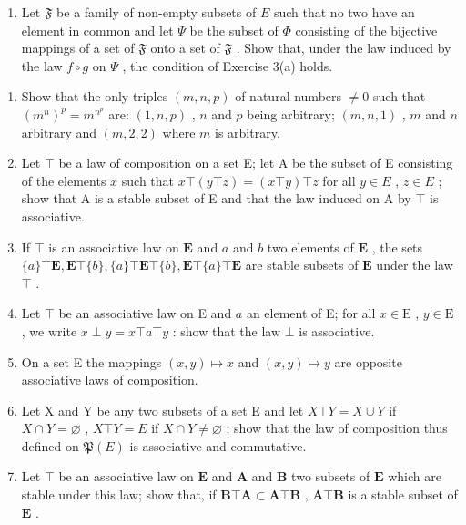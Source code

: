 \begin{enumerate}
\def\labelenumi{(\alph{enumi})}
\setcounter{enumi}{1}
\tightlist
\item
  Let \(\mathfrak{F}\) be a family of non-empty subsets of \(E\) such that no two have an element in common and let \(\Psi\) be the subset of \(\Phi\) consisting of the bijective mappings of a set of \(\mathfrak{F}\) onto a set of \(\mathfrak{F}\) . Show that, under the law induced by the law \(f \circ g\) on \(\Psi\) , the condition of Exercise 3(a) holds.
\end{enumerate}

\begin{enumerate}
\def\labelenumi{\arabic{enumi}.}
\setcounter{enumi}{4}
\item
  Show that the only triples \((m, n, p)\) of natural numbers \(\neq 0\) such that \((m^n)^p = m^{n^p}\) are: \((1, n, p)\) , \(n\) and \(p\) being arbitrary; \((m, n, 1)\) , \(m\) and \(n\) arbitrary and \((m, 2, 2)\) where \(m\) is arbitrary.
\item
  Let \(\top\) be a law of composition on a set E; let A be the subset of E consisting of the elements \(x\) such that \(x \top (y \top z) = (x \top y) \top z\) for all \(y \in E\) , \(z \in E\) ; show that A is a stable subset of E and that the law induced on A by \(\top\) is associative.
\item
  If \(\top\) is an associative law on \(\mathbf{E}\) and \(a\) and \(b\) two elements of \(\mathbf{E}\) , the sets \(\{a\} \top \mathbf{E}, \mathbf{E} \top \{b\}, \{a\} \top \mathbf{E} \top \{b\}, \mathbf{E} \top \{a\} \top \mathbf{E}\) are stable subsets of \(\mathbf{E}\) under the law \(\top\) .
\item
  Let \(\top\) be an associative law on E and \(a\) an element of E; for all \(x \in \mathrm{E}\) , \(y \in \mathrm{E}\) , we write \(x \perp y = x \top a \top y\) : show that the law \(\bot\) is associative.
\item
  On a set E the mappings \((x,y)\mapsto x\) and \((x,y)\mapsto y\) are opposite associative laws of composition.
\item
  Let X and Y be any two subsets of a set E and let \(X \top Y = X \cup Y\) if \(X \cap Y = \varnothing\) , \(X \top Y = E\) if \(X \cap Y \neq \varnothing\) ; show that the law of composition thus defined on \(\mathfrak{P}(E)\) is associative and commutative.
\item
  Let \(\top\) be an associative law on \(\mathbf{E}\) and \(\mathbf{A}\) and \(\mathbf{B}\) two subsets of \(\mathbf{E}\) which are stable under this law; show that, if \(\mathbf{B} \top \mathbf{A} \subset \mathbf{A} \top \mathbf{B}\) , \(\mathbf{A} \top \mathbf{B}\) is a stable subset of \(\mathbf{E}\) .

\end{enumerate}
